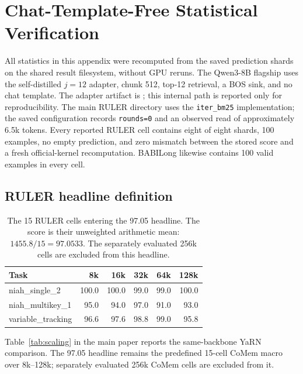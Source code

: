 \FloatBarrier
\section{Chat-Template-Free Statistical Verification}
\label{app:statistics}

All statistics in this appendix were recomputed from the saved prediction
shards on the shared result filesystem, without GPU reruns. The Qwen3-8B
flagship uses the self-distilled $j{=}12$ adapter, chunk 512, top-12 retrieval,
a BOS sink, and no chat template. The adapter artifact is
; this internal path is
reported only for reproducibility. The main RULER directory uses the
\texttt{iter\_bm25} implementation; the saved configuration records
\texttt{rounds=0} and an observed read of approximately 6.5k tokens. Every reported RULER cell contains eight of eight shards, 100
examples, no empty prediction, and zero mismatch between the stored score and a
fresh official-kernel recomputation. BABILong likewise contains 100 valid
examples in every cell.

\subsection{RULER headline definition}
\begin{table}[t]
\centering
\small
\setlength{\tabcolsep}{4pt}
\begin{tabular}{@{}lrrrrr@{}}
\toprule
\textbf{Task} & \textbf{8k} & \textbf{16k} & \textbf{32k} & \textbf{64k} & \textbf{128k} \\
\midrule
niah\_single\_2 & 100.0 & 100.0 & 99.0 & 99.0 & 100.0 \\
niah\_multikey\_1 & 95.0 & 94.0 & 97.0 & 91.0 & 93.0 \\
variable\_tracking & 96.6 & 97.6 & 98.8 & 99.0 & 95.8 \\
\bottomrule
\end{tabular}
\caption{The 15 RULER cells entering the 97.05 headline. The score is their
unweighted arithmetic mean: $1455.8/15=97.0533$. The separately evaluated 256k
cells are excluded from this headline.}
\label{tab:ruler-statistics}
\end{table}

Table~\ref{tab:scaling} in the main paper reports the same-backbone YaRN
comparison. The 97.05 headline remains the predefined 15-cell CoMem macro over
8k--128k; separately evaluated 256k CoMem cells are excluded from it.

\FloatBarrier
